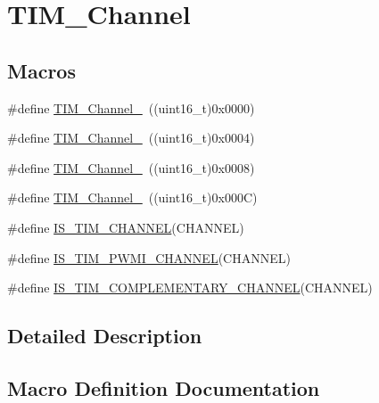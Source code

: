 \hypertarget{group___t_i_m___channel}{}\section{T\+I\+M\+\_\+\+Channel}
\label{group___t_i_m___channel}
\subsection*{Macros}
\begin{DoxyCompactItemize}
\item 
\#define \mbox{\hyperlink{group___t_i_m___channel_ga69ea7f558f02c63dd1082d784d2449bd}{T\+I\+M\+\_\+\+Channel\+\_}}~((uint16\+\_\+t)0x0000)
\item 
\#define \mbox{\hyperlink{group___t_i_m___channel_ga03d7da8269a87a560f68985b4bd80931}{T\+I\+M\+\_\+\+Channel\+\_}}~((uint16\+\_\+t)0x0004)
\item 
\#define \mbox{\hyperlink{group___t_i_m___channel_ga012711b19e8c91f6f352801a3dc0bcc9}{T\+I\+M\+\_\+\+Channel\+\_}}~((uint16\+\_\+t)0x0008)
\item 
\#define \mbox{\hyperlink{group___t_i_m___channel_ga7414888c40d066af235bc1f80b99bd9d}{T\+I\+M\+\_\+\+Channel\+\_}}~((uint16\+\_\+t)0x000\+C)
\item 
\#define \mbox{\hyperlink{group___t_i_m___channel_gae9721e3731e5fd983c83a9c1d32ef03d}{I\+S\+\_\+\+T\+I\+M\+\_\+\+C\+H\+A\+N\+N\+EL}}(C\+H\+A\+N\+N\+EL)
\item 
\#define \mbox{\hyperlink{group___t_i_m___channel_gacbf272b7a14f63b38bdbf18577835dce}{I\+S\+\_\+\+T\+I\+M\+\_\+\+P\+W\+M\+I\+\_\+\+C\+H\+A\+N\+N\+EL}}(C\+H\+A\+N\+N\+EL)
\item 
\#define \mbox{\hyperlink{group___t_i_m___channel_ga6f44459b7dfc4138bbc2c3795311c48c}{I\+S\+\_\+\+T\+I\+M\+\_\+\+C\+O\+M\+P\+L\+E\+M\+E\+N\+T\+A\+R\+Y\+\_\+\+C\+H\+A\+N\+N\+EL}}(C\+H\+A\+N\+N\+EL)
\end{DoxyCompactItemize}


\subsection{Detailed Description}


\subsection{Macro Definition Documentation}
\mbox{\label{group___t_i_m___channel_gae9721e3731e5fd983c83a9c1d32ef03d}} 
